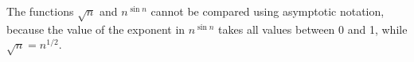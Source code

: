 The functions $\sqrt{n}$ and $n^{\sin n}$ cannot be compared using asymptotic notation, because the value of the exponent in $n^{\sin n}$ takes all values between 0 and 1, while $\sqrt{n}=n^{1/2}$.
